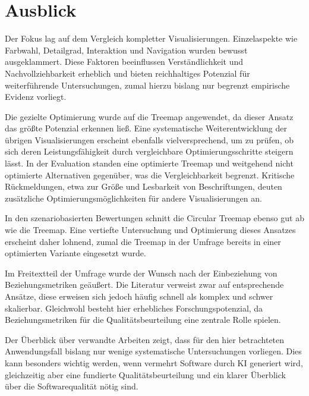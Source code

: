 \section{Ausblick} \label{sec:Ausblick}

Der Fokus lag auf dem Vergleich kompletter Visualisierungen. Einzelaspekte wie Farbwahl, Detailgrad, Interaktion und Navigation wurden bewusst ausgeklammert. Diese Faktoren beeinflussen Verständlichkeit und Nachvollziehbarkeit erheblich und bieten reichhaltiges Potenzial für weiterführende Untersuchungen, zumal hierzu bislang nur begrenzt empirische Evidenz vorliegt.

Die gezielte Optimierung wurde auf die Treemap angewendet, da dieser Ansatz das größte Potenzial erkennen ließ. Eine systematische Weiterentwicklung der übrigen Visualisierungen erscheint ebenfalls vielversprechend, um zu prüfen, ob sich deren Leistungsfähigkeit durch vergleichbare Optimierungsschritte steigern lässt. In der Evaluation standen eine optimierte Treemap und weitgehend nicht optimierte Alternativen gegenüber, was die Vergleichbarkeit begrenzt. Kritische Rückmeldungen, etwa zur Größe und Lesbarkeit von Beschriftungen, deuten zusätzliche Optimierungsmöglichkeiten für andere Visualisierungen an.

In den szenariobasierten Bewertungen schnitt die Circular Treemap ebenso gut ab wie die Treemap. Eine vertiefte Untersuchung und Optimierung dieses Ansatzes erscheint daher lohnend, zumal die Treemap in der Umfrage bereits in einer optimierten Variante eingesetzt wurde.

Im Freitextteil der Umfrage wurde der Wunsch nach der Einbeziehung von Beziehungsmetriken geäußert. Die Literatur verweist zwar auf entsprechende Ansätze, diese erweisen sich jedoch häufig schnell als komplex und schwer skalierbar. Gleichwohl besteht hier erhebliches Forschungspotenzial, da Beziehungsmetriken für die Qualitätsbeurteilung eine zentrale Rolle spielen.

Der Überblick über verwandte Arbeiten zeigt, dass für den hier betrachteten Anwendungsfall bislang nur wenige systematische Untersuchungen vorliegen. Dies kann besonders wichtig werden, wenn vermehrt Software durch KI generiert wird, gleichzeitig aber eine fundierte Qualitätsbeurteilung und ein klarer Überblick über die Softwarequalität nötig sind.